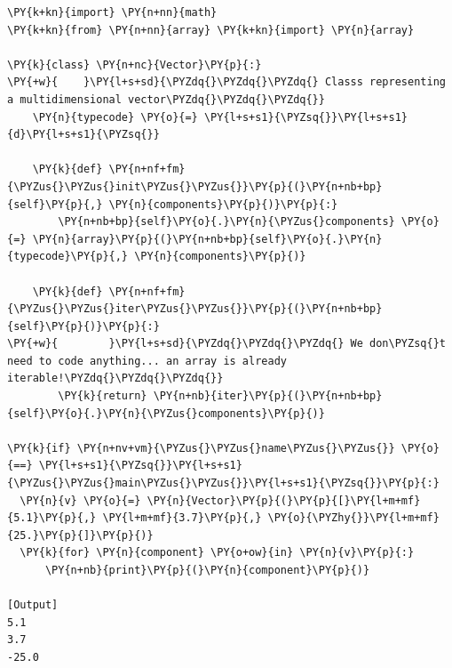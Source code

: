 \begin{Verbatim}[label=\makebox{\url{https://github.com/lucabaldini/cmepda/tree/master/slides/latex/snippets/vector\_iterable.py}},commandchars=\\\{\}]
\PY{k+kn}{import} \PY{n+nn}{math}
\PY{k+kn}{from} \PY{n+nn}{array} \PY{k+kn}{import} \PY{n}{array}

\PY{k}{class} \PY{n+nc}{Vector}\PY{p}{:}
\PY{+w}{    }\PY{l+s+sd}{\PYZdq{}\PYZdq{}\PYZdq{} Classs representing a multidimensional vector\PYZdq{}\PYZdq{}\PYZdq{}}    
    \PY{n}{typecode} \PY{o}{=} \PY{l+s+s1}{\PYZsq{}}\PY{l+s+s1}{d}\PY{l+s+s1}{\PYZsq{}}
    
    \PY{k}{def} \PY{n+nf+fm}{\PYZus{}\PYZus{}init\PYZus{}\PYZus{}}\PY{p}{(}\PY{n+nb+bp}{self}\PY{p}{,} \PY{n}{components}\PY{p}{)}\PY{p}{:}
        \PY{n+nb+bp}{self}\PY{o}{.}\PY{n}{\PYZus{}components} \PY{o}{=} \PY{n}{array}\PY{p}{(}\PY{n+nb+bp}{self}\PY{o}{.}\PY{n}{typecode}\PY{p}{,} \PY{n}{components}\PY{p}{)}
        
    \PY{k}{def} \PY{n+nf+fm}{\PYZus{}\PYZus{}iter\PYZus{}\PYZus{}}\PY{p}{(}\PY{n+nb+bp}{self}\PY{p}{)}\PY{p}{:}
\PY{+w}{        }\PY{l+s+sd}{\PYZdq{}\PYZdq{}\PYZdq{} We don\PYZsq{}t need to code anything... an array is already iterable!\PYZdq{}\PYZdq{}\PYZdq{}}
        \PY{k}{return} \PY{n+nb}{iter}\PY{p}{(}\PY{n+nb+bp}{self}\PY{o}{.}\PY{n}{\PYZus{}components}\PY{p}{)}

\PY{k}{if} \PY{n+nv+vm}{\PYZus{}\PYZus{}name\PYZus{}\PYZus{}} \PY{o}{==} \PY{l+s+s1}{\PYZsq{}}\PY{l+s+s1}{\PYZus{}\PYZus{}main\PYZus{}\PYZus{}}\PY{l+s+s1}{\PYZsq{}}\PY{p}{:}
  \PY{n}{v} \PY{o}{=} \PY{n}{Vector}\PY{p}{(}\PY{p}{[}\PY{l+m+mf}{5.1}\PY{p}{,} \PY{l+m+mf}{3.7}\PY{p}{,} \PY{o}{\PYZhy{}}\PY{l+m+mf}{25.}\PY{p}{]}\PY{p}{)}
  \PY{k}{for} \PY{n}{component} \PY{o+ow}{in} \PY{n}{v}\PY{p}{:}
      \PY{n+nb}{print}\PY{p}{(}\PY{n}{component}\PY{p}{)}

[Output]
5.1
3.7
-25.0
\end{Verbatim}
